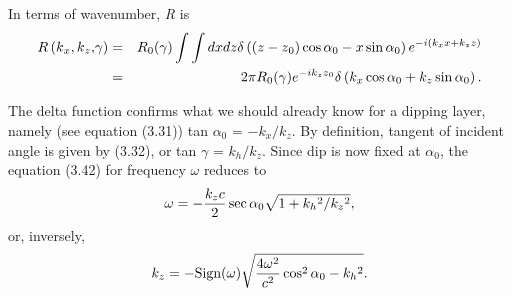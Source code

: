 In terms of wavenumber, \textit{R} is
\begin{eqnarray}
\text{\textit{$R$}}\left(\text{\textit{$k$}}_{\text{\textit{$x$}}},\text{\textit{$k$}}_{\text{\textit{$z$}}}\text{\textit{$,$}}\gamma
\right) & = & \text{\textit{$R$}}_0(\gamma )\int \int d\text{\textit{$x$}}d\text{\textit{$z$}}\text{\textit{$ $}}\delta \left(\left(\text{\textit{$z$}}-\text{\textit{$z$}}_0\right)\cos
 \alpha _0-\text{\textit{$x$}}\text{\textit{$ $}}\sin  \alpha _0\right)e^{-i\left(\text{\textit{$k_xx$}}+\text{\textit{$k_zz$}}\right)} \nonumber\\
& = & 2\pi \text{\textit{$R$}}_0(\gamma )e^{-i \text{\textit{$k_z$}}\text{\textit{$z$}}_0}\delta \left(\text{\textit{$k_x$}}\cos  \alpha _0+\text{\textit{$k_z$}}\sin
 \alpha _0\right).
\end{eqnarray}

The delta function confirms what we should already know for a dipping layer, namely (see equation (3.31)) tan \(\alpha _0\) = \(-k_x/k_z\).  By
definition, tangent of incident angle is given by (3.32), or tan $\gamma $ = \(k_h/k_z\). Since dip is now fixed at \(\alpha _0\), the equation
(3.42) for frequency $\omega $ reduces to
\begin{equation}\omega =-\frac{\text{\textit{$k_zc$}}}{2}\sec  \alpha _0\sqrt{1+\text{\textit{$k_h$}}{}^2/\text{\textit{$k_z$}}{}^2},\end{equation}
or, inversely,
\begin{equation}\text{\textit{$k_z$}}=-\text{Sign}(\omega )\sqrt{\frac{4\omega ^2}{\text{\textit{$c$}}^2}\cos ^2\alpha _0-\text{\textit{$k_h$}}{}^2}.\end{equation}


